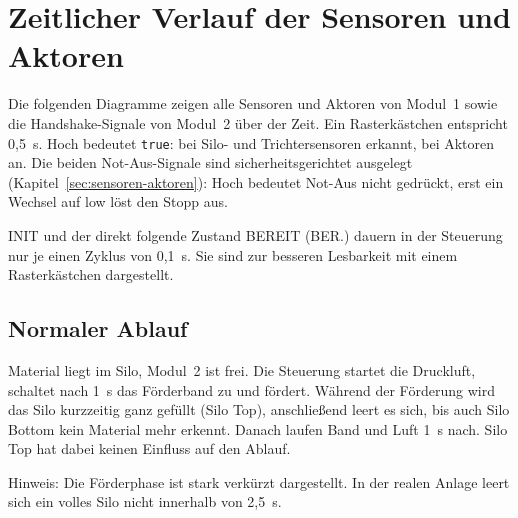 \chapter{Zeitlicher Verlauf der Sensoren und Aktoren}
\label{chap:zeitverlauf}

%

Die folgenden Diagramme zeigen alle Sensoren und Aktoren von Modul~1 sowie die
Handshake-Signale von Modul~2 über der Zeit. Ein Rasterkästchen entspricht
0,5~s. Hoch bedeutet \texttt{true}: bei Silo- und Trichtersensoren
\glqq erkannt\grqq, bei Aktoren \glqq an\grqq. Die beiden Not-Aus-Signale sind
sicherheitsgerichtet ausgelegt (Kapitel~\ref{sec:sensoren-aktoren}): Hoch
bedeutet \glqq Not-Aus nicht gedrückt\grqq, erst ein Wechsel auf low löst den
Stopp aus.

INIT und der direkt folgende Zustand BEREIT (\glqq BER.\grqq) dauern in der
Steuerung nur je einen Zyklus von 0,1~s. Sie sind zur besseren Lesbarkeit
mit einem Rasterkästchen dargestellt.

\section{Normaler Ablauf}
\label{sec:verlauf-normal}

Material liegt im Silo, Modul~2 ist frei. Die Steuerung startet die Druckluft,
schaltet nach 1~s das Förderband zu und fördert. Während der Förderung wird das
Silo kurzzeitig ganz gefüllt (Silo Top), anschließend leert es sich, bis auch
Silo Bottom kein Material mehr erkennt. Danach laufen Band und Luft 1~s nach.
Silo Top hat dabei keinen Einfluss auf den Ablauf.

Hinweis: Die Förderphase ist stark verkürzt dargestellt. In der realen Anlage
leert sich ein volles Silo nicht innerhalb von 2,5~s.

